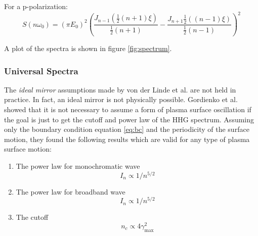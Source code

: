 For a p-polarization:
\begin{equation}
    \label{eq:p-spectrum}
    S(n\omega_0) = (\pi E_0)^2\left(\frac{J_{n-1}(\frac{1}{2}(n+1)\xi)}{\frac{1}{2}(n+1)}- \frac{J_{n+1}\frac{1}{2}((n-1)\xi)}{\frac{1}{2}(n-1)}\right)^2
\end{equation}

A plot of the spectra is shown in figure \ref{fig:spectrum}.
\subsubsection{Universal Spectra}
The \textit{ideal mirror} assumptions made by von der Linde et al.\cite{hhg-main} are not held in practice. In fact, an ideal mirror is not physically possible. Gordienko et al.\cite{universal-spectra} showed that it is not necessary to assume a form of plasma surface oscillation if the goal is just to get the cutoff and power law of the HHG spectrum. Assuming only the boundary condition equation \ref{eq:bc} and the periodicity of the surface motion, they found the following results which are valid for any type of plasma surface motion:
\begin{enumerate}
    \item The power law for monochromatic wave
          \begin{equation}
              \label{eq:power-law-u}
              I_n \propto 1/n^{5/2}
          \end{equation}
    \item The power law for broadband wave
          \begin{equation*}
              I_n \propto 1/n^{5/2}
          \end{equation*}
    \item The cutoff
          \begin{equation}
              \label{eq:cutoff-u}
              n_c \propto 4\gamma_{\max}^2
          \end{equation}
\end{enumerate}
